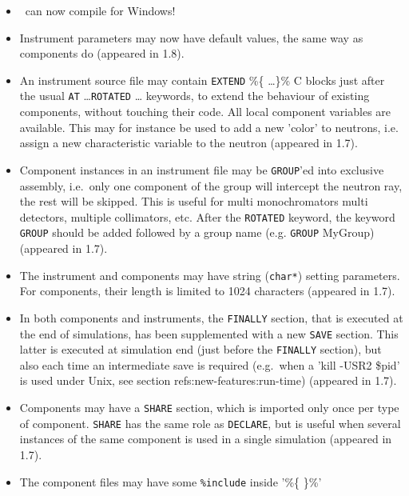 \begin{itemize}
\item \MCS\ can now compile for Windows!
\item Instrument parameters may now have default values, the same way as components do 
    (appeared in 1.8). 
\item An instrument source file may contain \texttt{EXTEND} \%\{ \ldots \}\% C
    blocks just after the usual \texttt{AT} \ldots \texttt{ROTATED} \ldots
    keywords, to extend the behaviour of existing components, without touching
    their code. All local component variables are  available. This may for
    instance be used to add a new 'color' to neutrons,  i.e. assign a new
    characteristic variable to the neutron (appeared in 1.7).
\item Component instances in an instrument file may be \texttt{GROUP}'ed into 
    exclusive assembly, i.e.\ only one component of the group will intercept
    the neutron ray, the rest will be skipped. This is useful for multi
    monochromators multi detectors, multiple collimators, etc.  After the
    \texttt{ROTATED} keyword, the keyword \texttt{GROUP} should be added
    followed by a group name (e.g. \texttt{GROUP} MyGroup)  (appeared in 1.7).
\item The instrument and components may have string (\verb+char*+) setting
    parameters. For components, their length is limited to 1024 characters
    (appeared in 1.7).  
\item In both components and instruments, the \texttt{FINALLY} section, that is
    executed at the end of simulations, has been supplemented with a new
    \texttt{SAVE} section. This latter is executed at simulation end (just
    before the \texttt{FINALLY} section), but also each time an intermediate
    save is required (e.g.\   when a 'kill -USR2 \$pid' is used under Unix, see
    section ref{s:new-features:run-time})  (appeared in 1.7). 
      
\item Components may have a \texttt{SHARE} section, which is imported only once
    per type of component. \texttt{SHARE} has the same role as
    \texttt{DECLARE}, but is useful when several instances of the same
    component is used in a single simulation  (appeared in 1.7).
     
\item The component files may have some \texttt{\%include} inside '\%\{ \}\%'

\end{itemize}
